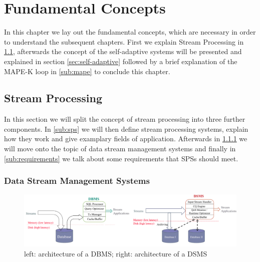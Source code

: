 
\chapter{Fundamental Concepts}
\label{cha:fundamentals}
In this chapter we lay out the fundamental concepts, which are necessary in order to understand the subsequent chapters.
First we explain Stream Processing in \ref{sec:stream-processing}, afterwards the concept of the self-adaptive systems will be presented and explained in section \ref{sec:self-adaptive} 
followed by a brief explanation of the MAPE-K loop in \ref{sub:mape} to conclude this chapter.

    \section{Stream Processing}
    \label{sec:stream-processing}
    In this section we will split the concept of stream processing into three further components.
    In \ref{sub:sps} we will then define stream processing systems, explain how they work and give examplary fields of application.
    Afterwards in \ref{sub:dsms} we will move onto the topic of data stream management systems and finally in \ref{sub:requirements} we talk about
    some requirements that SPSs should meet.
    
        \subsection{Data Stream Management Systems}
        \label{sub:dsms}

        \begin{figure}[h]
            
            \centering
            \includegraphics[width=1.0\textwidth]{Bilder/dbms_dsms.png}
            \caption{
                   left: architecture of a DBMS; right: architecture of a DSMS
            }
            \label{fig:dbms_dsms}
        \end{figure}

